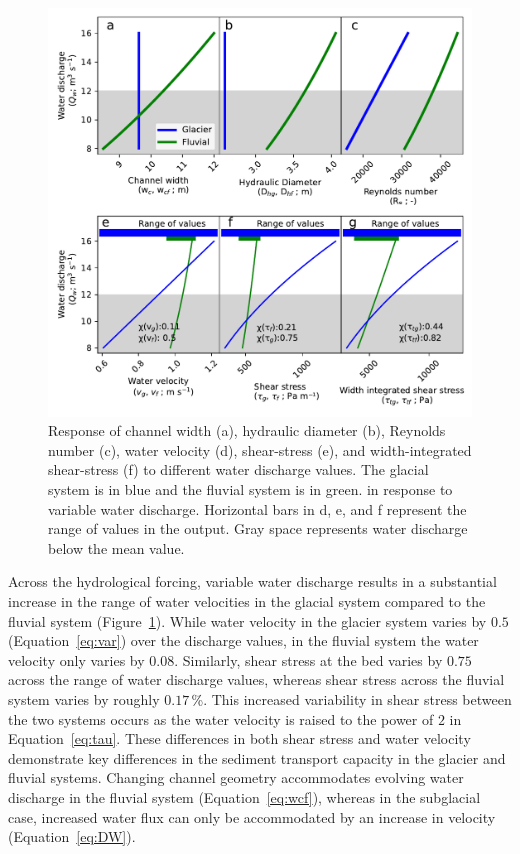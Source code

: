 \documentclass[11pt]{article}
\begin{document}
\begin{spacing}{1}
          \begin{center}
            \begin{figure}[H]
              \includegraphics[width=0.9\linewidth]{model_outputs.pdf}
              \caption{Response of channel width (a), hydraulic diameter (b),  Reynolds number  (c),  water velocity (d), shear-stress (e), and width-integrated shear-stress (f)  to different water discharge values. The glacial system is in blue and the fluvial system is in green. in response to variable water discharge. Horizontal bars in d, e, and f represent the range of values in the  output. Gray space represents water discharge below the mean value. }
              \label{fig:model_outs}
            \end{figure}
          \end{center}
          
          Across the hydrological forcing, variable water discharge results in a substantial increase in the range of water velocities in the glacial system compared to the fluvial system (Figure~\ref{fig:model_outs}).
          While water velocity in the glacier system varies by  $0.5$ (Equation~\ref{eq:var}) over the discharge values, in the fluvial system the water velocity only varies by $0.08$.
          Similarly, shear stress at the bed varies by $0.75$ across the range of water discharge values, whereas shear stress across the fluvial system varies by roughly $0.17$\,\%. This increased variability  in shear stress between the two systems occurs as the water velocity is raised to the power of $2$ in Equation~\ref{eq:tau}. 
          These differences in both shear stress and water velocity demonstrate key differences in the sediment transport capacity in the glacier and fluvial systems.
          Changing channel geometry accommodates evolving water discharge in the fluvial system (Equation~\ref{eq:wcf}), whereas in the subglacial case, increased water flux can only be accommodated by an increase in velocity (Equation~\ref{eq:DW}).
          

\end{spacing}
\end{document}
